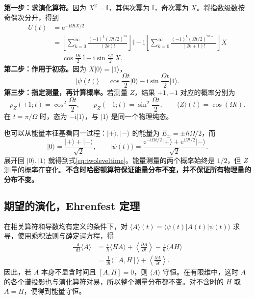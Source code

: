 \documentclass[a4paper,11pt]{article}
\numberwithin{equation}{section}
\newcommand{\ii}{\mathrm{i}}
\newcommand{\dd}{\mathop{}\!\mathrm{d}}
\newcommand{\ee}{\mathrm{e}}
\newcommand{\I}{\mathbb I}
\newcommand{\ket}[1]{\lvert #1\rangle}
\newcommand{\mel}[3]{\langle #1\rvert #2\lvert #3\rangle}
\newcommand{\avg}[1]{\langle #1\rangle}
\begin{document}
\textbf{第一步：求演化算符。}因为 $X^2=\I$，其偶次幂为 $\I$，奇次幂为 $X$。将指数级数按奇偶次分开，得到
\begin{align}
  U(t)&=\ee^{-\ii\Omega tX/2}\\
  &=\left[\sum_{k=0}^{\infty}\frac{(-1)^k(\Omega t/2)^{2k}}{(2k)!}\right]\I
  -\ii\left[\sum_{k=0}^{\infty}\frac{(-1)^k(\Omega t/2)^{2k+1}}{(2k+1)!}\right]X\\
  &=\cos\frac{\Omega t}{2}\,\I
  -\ii\sin\frac{\Omega t}{2}\,X.
\end{align}
\textbf{第二步：作用于初态。}因为 $X\ket{0}=\ket{1}$，
\begin{equation}\label{eq:twoleveltime}
  \ket{\psi(t)}=\cos\frac{\Omega t}{2}\ket{0}
  -\ii\sin\frac{\Omega t}{2}\ket{1}.
\end{equation}
\textbf{第三步：指定测量，再计算概率。}若测量 $Z$，结果 $+1,-1$ 对应的概率分别为
\begin{equation}
  p_Z(+1;t)=\cos^2\frac{\Omega t}{2},\qquad
  p_Z(-1;t)=\sin^2\frac{\Omega t}{2},\qquad
  \avg{Z}(t)=\cos(\Omega t).
\end{equation}
在 $t=\pi/\Omega$ 时，态为 $-\ii\ket{1}$，与 $\ket{1}$ 是同一个物理纯态。

也可以从能量本征基看同一过程：$\ket{+},\ket{-}$ 的能量为 $E_\pm=\pm\hbar\Omega/2$，而
\begin{equation}
  \ket{0}=\frac{\ket{+}+\ket{-}}{\sqrt2},\qquad
  \ket{\psi(t)}=
  \frac{\ee^{-\ii\Omega t/2}\ket{+}+\ee^{\ii\Omega t/2}\ket{-}}{\sqrt2}.
\end{equation}
展开回 $\ket{0},\ket{1}$ 就得到式\eqref{eq:twoleveltime}。能量测量的两个概率始终是 $1/2$，但 $Z$ 测量的概率在变化。\textbf{不含时哈密顿算符保证能量分布不变，并不保证所有物理量的分布不变。}


\subsection{期望的演化，Ehrenfest 定理}
在相关算符和导数均有定义的条件下，对 $\avg{A}(t)=\mel{\psi(t)}{A(t)}{\psi(t)}$ 求导，使用乘积法则与薛定谔方程，得
\begin{align}
  \frac{\dd}{\dd t}\avg{A}
  &=\frac{\ii}{\hbar}\avg{HA}
    +\left\langle\frac{\partial A}{\partial t}\right\rangle
    -\frac{\ii}{\hbar}\avg{AH}\\
  &=\boxed{\frac{1}{\ii\hbar}\avg{[A,H]}
    +\left\langle\frac{\partial A}{\partial t}\right\rangle.}\label{eq:Ehrenfest}
\end{align}
因此，若 $A$ 本身不显含时间且 $[A,H]=0$，则 $\avg{A}$ 守恒。在有限维中，这时 $A$ 的各个谱投影也与演化算符对易，所以整个测量分布都不变。对不含时的 $H$ 取 $A=H$，便得到能量守恒。
\end{document}
